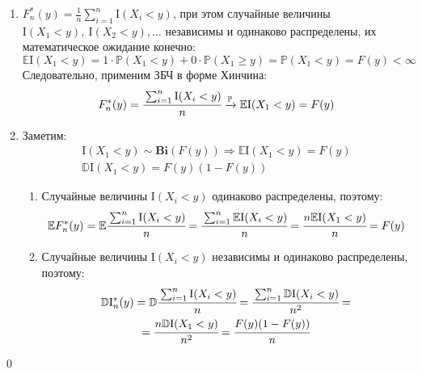 \documentclass[oneside,final,14pt]{extreport}
\renewenvironment{proof}{{\bfseries Доказательство.}}{\qed}
\theoremstyle{definition}
\begin{document}
\begin{proof}\leavevmode
\begin{enumerate}
    \item $F_{n}^{*}(y)=\frac{1}{n} \sum_{i=1}^{n} \mathrm{I}(X_{i}<y)$, при этом случайные величины $\mathrm{I}(X_{1}<y),~ \mathrm{I}(X_{2}<y), \ldots$ независимы и одинаково распределены, их математическое ожидание конечно:
    \begin{equation*}
        \mathbb{E}\mathrm{I}(X_{1}<y)=1 \cdot \mathbb{P}(X_{1}<y)+0 \cdot \mathbb{P}(X_{1} \geqslant y)=\mathbb{P}(X_{1}<y)=F(y)<\infty
    \end{equation*}
    Следовательно, применим ЗБЧ в форме Хинчина:
    \begin{equation*}
        F_{n}^{*}(y)=\cfrac{\sum_{i=1}^{n} \mathrm{I}(X_{i}<y)}{n} \xrightarrow[]{\mathbb{P}} \mathbb{E}\mathrm{I}(X_{1}<y)=F(y) 
    \end{equation*}
    \item Заметим:
    \begin{gather*}
        \mathrm{I}(X_{1}<y) \sim  \mathbf{Bi}(F(y)) \Rightarrow \mathbb{E}\mathrm{I}(X_{1}<y) = F(y) \\
        \mathbb{D}\mathrm{I}(X_{1}<y) = F(y)(1-F(y))
    \end{gather*}
    \begin{enumerate}[label={\arabic*)}]
        \item Случайные величины $\mathrm{I}(X_{i}<y)$ одинаково распределены, поэтому:
        \begin{equation*}
            \mathbb{E} F_{n}^{*}(y)=\mathbb{E} \cfrac{\sum_{i=1}^{n} \mathrm{I}(X_{i}<y)}{n}=\cfrac{\sum_{i=1}^{n} \mathbb{E}\mathrm{I}(X_{i}<y)}{n}=\cfrac{n \mathbb{E}\mathrm{I}(X_{1}<y)}{n}=F(y)  
        \end{equation*}
        
        \item Случайные величины $\mathrm{I}(X_{i}<y)$ независимы и одинаково распределены, поэтому:
        \begin{multline*}
            \mathbb{D}\mathrm{I}_{n}^{*}(y)
            = \mathbb{D} \cfrac{\sum_{i=1}^{n} \mathrm{I}(X_{i}<y)}{n}
            = \cfrac{\sum_{i=1}^{n} \mathbb{D}\mathrm{I}(X_{i}<y)}{n^{2}}
            = \\
            = \cfrac{n\mathbb{D}\mathrm{I}(X_{1}<y)}{n^{2}}
            = \cfrac{F(y)(1-F(y))}{n}
        \end{multline*}
    

\end{enumerate}
\end{enumerate}
\end{proof}
\end{document}
